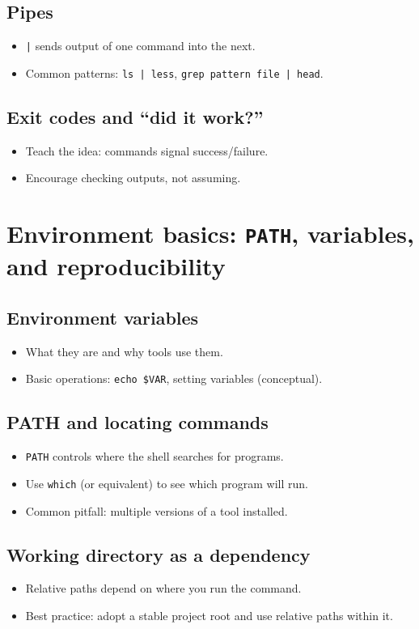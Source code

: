 \subsection{Pipes}
\begin{itemize}
\item \texttt{|} sends output of one command into the next.
\item Common patterns: \texttt{ls | less}, \texttt{grep pattern file | head}.
\end{itemize}

\subsection{Exit codes and ``did it work?''}
\begin{itemize}
\item Teach the idea: commands signal success/failure.
\item Encourage checking outputs, not assuming.
\end{itemize}

\section{Environment basics: \texttt{PATH}, variables, and reproducibility}
\subsection{Environment variables}
\begin{itemize}
\item What they are and why tools use them.
\item Basic operations: \texttt{echo \$VAR}, setting variables (conceptual).
\end{itemize}

\subsection{PATH and locating commands}
\begin{itemize}
\item \texttt{PATH} controls where the shell searches for programs.
\item Use \texttt{which} (or equivalent) to see which program will run.
\item Common pitfall: multiple versions of a tool installed.
\end{itemize}

\subsection{Working directory as a dependency}
\begin{itemize}
\item Relative paths depend on where you run the command.
\item Best practice: adopt a stable project root and use relative paths within it.
\end{itemize}


